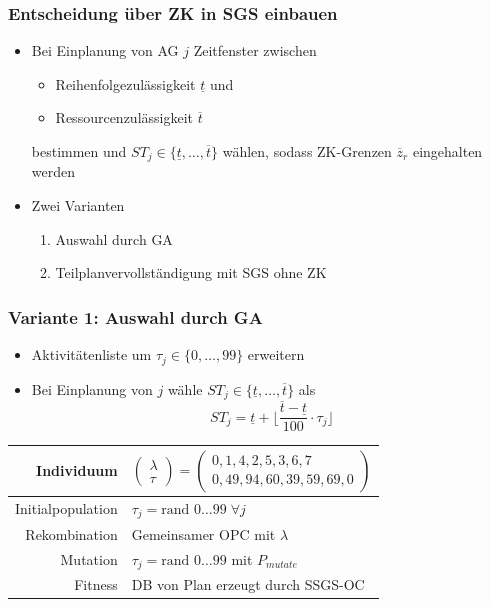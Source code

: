 \begin{frame}
\frametitle{Entscheidung über ZK in SGS einbauen}

\begin{itemize}
\item Bei Einplanung von AG $j$ Zeitfenster zwischen
	\begin{itemize}
	\item Reihenfolgezulässigkeit $\underline{t}$ und
	\item Ressourcenzulässigkeit $\overline{t}$
	\end{itemize}
bestimmen und $ST_j \in \{ \underline{t}, \ldots, \overline{t} \}$ wählen, sodass ZK-Grenzen $\overline{z}_r$ eingehalten werden\\[8mm]
\item Zwei Varianten
\begin{enumerate}
	\item Auswahl durch GA 
	\item Teilplanvervollständigung mit SGS ohne ZK
	\end{enumerate}
\end{itemize}

\end{frame}

\begin{frame}
\frametitle{Variante 1: Auswahl durch GA}
\begin{itemize}
\item Aktivitätenliste um $\tau_j \in \{ 0, \ldots, 99 \}$ erweitern
\item Bei Einplanung von $j$ wähle $ST_j \in \{ \underline{t}, \ldots, \overline{t} \}$ als \[ST_j = \underline{t} + \lfloor \frac{\overline{t}-\underline{t}}{100} \cdot \tau_j \rfloor\]
\end{itemize}

\begin{small}
\begin{center}
\begin{tabular}{rl}
\hline 
Individuum & $\begin{pmatrix}\lambda\\\tau\end{pmatrix}=\begin{pmatrix}0,1,4,2,5,3,6,7\\0,49,94,60,39,59,69,0\end{pmatrix}$\parbox[c][40pt][c]{0pt}{}\tabularnewline
\hline 
Initialpopulation & $\tau_j=\mbox{rand }0\ldots99 \; \forall j$\tabularnewline
\hline 
Rekombination & Gemeinsamer OPC mit $\lambda$\tabularnewline
\hline 
Mutation & $\tau_j=\mbox{rand }0\ldots99$ mit $P_{mutate}$\tabularnewline
\hline 
Fitness & DB von Plan erzeugt durch SSGS-OC\tabularnewline
\hline 
\end{tabular}
\end{center}
\end{small}

\end{frame}

